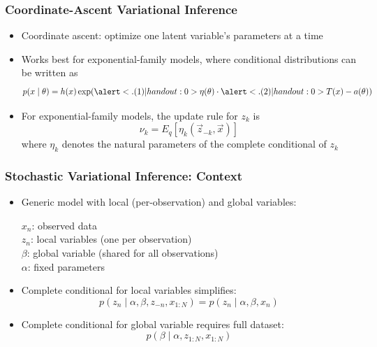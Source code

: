 \begin{frame}
\frametitle{Coordinate-Ascent Variational Inference}
\begin{itemize}[<+->]
\item Coordinate ascent: optimize one latent variable's parameters at a time
\item Works best for exponential-family models, where conditional distributions can be written as
\[ p(x \mid \theta) = h(x) \exp( \alert<.(1)| handout:0>{\eta(\theta)} \cdot \alert<.(2)| handout:0>{T(x)} - a(\theta)) \]
\item For exponential-family models, the update rule for $z_k$ is
\[ \nu_k = E_q[\eta_k(\vec z_{-k}, \vec x)] \]
where $\eta_k$ denotes the natural parameters of the complete conditional of $z_k$
\end{itemize}
\end{frame}

\begin{frame}
\frametitle{Stochastic Variational Inference: Context}
\begin{itemize}[<+->]
\item Generic model with local (per-observation) and global variables:
\begin{center}
\end{center}
$x_n$: observed data \\
$z_n$: local variables (one per observation) \\
$\beta$: global variable (shared for all observations) \\
$\alpha$: fixed parameters
\item Complete conditional for local variables simplifies:
\[ p(z_n \mid \alpha, \beta, z_{-n}, x_{1:N}) = p(z_n \mid \alpha, \beta, x_n) \]
\item Complete conditional for global variable requires full dataset:
\[ p(\beta \mid \alpha, z_{1:N}, x_{1:N}) \]
\end{itemize}
\end{frame}

